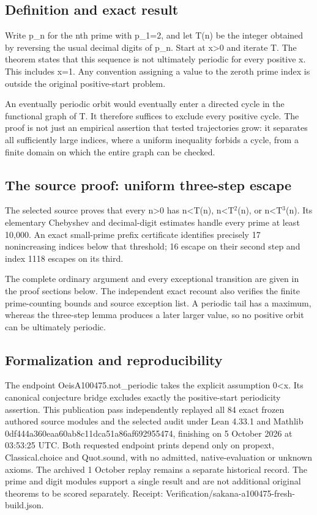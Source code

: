 \documentclass[11pt,a4paper]{article}
\begin{document}
\subsection{Definition and exact result}
Write p\_n for the nth prime with p\_1=2, and let T(n) be the integer obtained by reversing the usual decimal digits of p\_n. Start at x>0 and iterate T. The theorem states that this sequence is not ultimately periodic for every positive x. This includes x=1. Any convention assigning a value to the zeroth prime index is outside the original positive-start problem.

An eventually periodic orbit would eventually enter a directed cycle in the functional graph of T. It therefore suffices to exclude every positive cycle. The proof is not just an empirical assertion that tested trajectories grow: it separates all sufficiently large indices, where a uniform inequality forbids a cycle, from a finite domain on which the entire graph can be checked.

\subsection{The source proof: uniform three-step escape}
The selected source proves that every n>0 has n<T(n), n<T\ensuremath{^2}(n), or n<T\ensuremath{^3}(n). Its elementary Chebyshev and decimal-digit estimates handle every prime at least 10,000. An exact small-prime prefix certificate identifies precisely 17 nonincreasing indices below that threshold; 16 escape on their second step and index 1118 escapes on its third.

The complete ordinary argument and every exceptional transition are given in the proof sections below. The independent exact recount also verifies the finite prime-counting bounds and source exception list. A periodic tail has a maximum, whereas the three-step lemma produces a later larger value, so no positive orbit can be ultimately periodic.

\subsection{Formalization and reproducibility}
The endpoint OeisA100475.not\_periodic takes the explicit assumption 0<x. Its canonical conjecture bridge excludes exactly the positive-start periodicity assertion. This publication pass independently replayed all 84 exact frozen authored source modules and the selected audit under Lean 4.33.1 and Mathlib 0df444a360eaa60ab8c11dca51a86af692955474, finishing on 5 October 2026 at 03:53:25 UTC. Both requested endpoint prints depend only on propext, Classical.choice and Quot.sound, with no admitted, native-evaluation or unknown axioms. The archived 1 October replay remains a separate historical record. The prime and digit modules support a single result and are not additional original theorems to be scored separately. Receipt: Verification/sakana-a100475-fresh-build.json.
\end{document}
